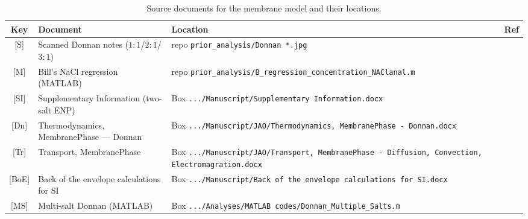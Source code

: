 \documentclass[11pt]{article}
\begin{document}
\begin{table}[H]
\centering\footnotesize
\begin{tabular}{c p{3.4cm} p{6.6cm} l}
\toprule
Key & Document & Location & Ref \\
\midrule
{[S]}   & Scanned Donnan notes ($1{:}1$/$2{:}1$/$3{:}1$) & repo \texttt{prior\_analysis/Donnan *.jpg} & \cite{donnan11notes,donnan21notes,donnan31notes} \\
{[M]}   & Bill's NaCl regression (MATLAB) & repo \texttt{prior\_analysis/B\_\allowbreak{}regression\_\allowbreak{}concentration\_\allowbreak{}NAClanal.m} & \cite{billmatlab} \\
{[SI]}  & Supplementary Information (two-salt ENP) & Box \texttt{.../Manuscript/Supplementary Information.docx} & \cite{siDocx} \\
{[Dn]}& Thermodynamics, MembranePhase --- Donnan & Box \texttt{.../\allowbreak{}Manuscript/\allowbreak{}JAO/\allowbreak{}Thermodynamics, MembranePhase - Donnan.docx} & \cite{donnanThermoDoc} \\
{[Tr]}& Transport, MembranePhase & Box \texttt{.../\allowbreak{}Manuscript/\allowbreak{}JAO/\allowbreak{}Transport, MembranePhase - Diffusion, Convection, Electromagration.docx} & \cite{transportDoc} \\
{[BoE]}& Back of the envelope calculations for SI & Box \texttt{.../Manuscript/Back of the envelope calculations for SI.docx} & \cite{boeDoc} \\
{[MS]}& Multi-salt Donnan (MATLAB) & Box \texttt{.../Analyses/MATLAB codes/Donnan\_Multiple\_Salts.m} & \cite{multisaltMatlab} \\
\bottomrule
\end{tabular}
\caption{Source documents for the membrane model and their locations.}
\label{tab:sources}
\end{table}
\end{document}
